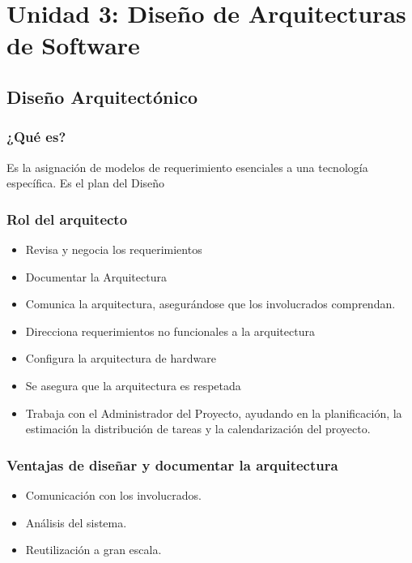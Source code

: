 \section{Unidad 3: Diseño de Arquitecturas de Software}
\subsection{Diseño Arquitectónico}
\subsubsection{¿Qué es?}
Es la asignación de modelos de requerimiento esenciales a una tecnología específica. Es el plan del Diseño
\subsubsection{Rol del arquitecto}
\begin{itemize}
\item Revisa y negocia los requerimientos
\item Documentar la Arquitectura
\item Comunica la arquitectura, asegurándose que los involucrados comprendan.
\item Direcciona requerimientos no funcionales a la arquitectura
\item Configura la arquitectura de hardware
\item Se asegura que la arquitectura es respetada
\item Trabaja con el Administrador del Proyecto, ayudando en la planificación, la estimación la distribución de tareas y la calendarización del proyecto.
\end{itemize}
\subsubsection{Ventajas de diseñar y documentar la arquitectura}
\begin{itemize}
	\item Comunicación con los involucrados.
	\item Análisis del sistema.
	\item Reutilización a gran escala.
\end{itemize}
